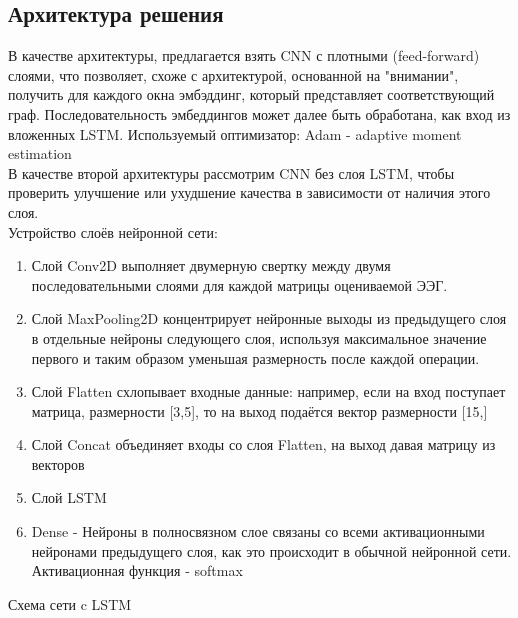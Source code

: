 \documentclass[12pt, a4paper, titlepage]{extreport}
\begin{document}
	\subsection*{Архитектура решения}
	В качестве архитектуры, предлагается взять CNN с плотными (feed-forward) слоями, что позволяет, схоже с архитектурой, основанной на "внимании", получить для каждого окна эмбэддинг, который представляет соответствующий граф. Последовательность эмбеддингов может далее быть обработана, как вход из вложенных LSTM. Используемый оптимизатор: Adam - adaptive moment estimation \cite{45}\\
	В качестве второй архитектуры рассмотрим CNN без слоя LSTM, чтобы проверить улучшение или ухудшение качества в зависимости от наличия этого слоя. \\
	Устройство слоёв нейронной сети:
	\begin{enumerate}
		\item Слой Conv2D выполняет двумерную свертку между двумя последовательными слоями для каждой матрицы оцениваемой ЭЭГ.
		\item Слой MaxPooling2D концентрирует нейронные выходы из предыдущего слоя в отдельные нейроны следующего слоя, используя максимальное значение первого и таким образом уменьшая размерность после каждой операции.
		\item Слой Flatten схлопывает входные данные: например, если на вход поступает матрица, размерности [3,5], то на выход подаётся вектор размерности [15,]
		\item Слой Concat объединяет входы со слоя Flatten, на выход давая матрицу из векторов
		\item Слой LSTM 
		\item Dense - Нейроны в полносвязном слое связаны со всеми активационными нейронами предыдущего слоя, как это происходит в обычной нейронной сети. Активационная функция - softmax
	\end{enumerate}
	Схема сети c LSTM
	\\
\end{document}
